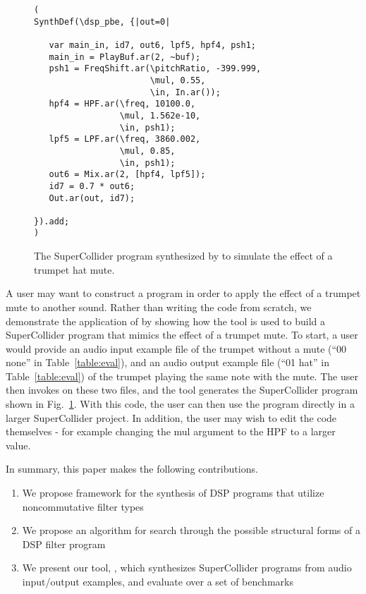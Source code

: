 \begin{figure}
\begin{lstlisting}
( 
SynthDef(\dsp_pbe, {|out=0|

   var main_in, id7, out6, lpf5, hpf4, psh1;
   main_in = PlayBuf.ar(2, ~buf);
   psh1 = FreqShift.ar(\pitchRatio, -399.999, 
                       \mul, 0.55, 
                       \in, In.ar());
   hpf4 = HPF.ar(\freq, 10100.0, 
                 \mul, 1.562e-10, 
                 \in, psh1);
   lpf5 = LPF.ar(\freq, 3860.002, 
                 \mul, 0.85, 
                 \in, psh1);
   out6 = Mix.ar(2, [hpf4, lpf5]);
   id7 = 0.7 * out6;
   Out.ar(out, id7);

}).add;
)
\end{lstlisting}
\caption{The SuperCollider program synthesized by \ourTool to simulate the effect of a trumpet hat mute.}
\label{fig:sc_code}
\end{figure}

A user may want to construct a program in order to apply the effect of a trumpet mute to another sound.
Rather than writing the code from scratch, we demonstrate the application of \ourTool by showing how the tool is used to build a SuperCollider program that mimics the effect of a trumpet mute.
To start, a user would provide an audio input example file of the trumpet without a mute (``00 none'' in Table~\ref{table:eval}), and an audio output example file (``01 hat'' in Table~\ref{table:eval}) of the trumpet playing the same note with the mute.
The user then invokes \ourTool on these two files, and the tool generates the SuperCollider program shown in Fig.~\ref{fig:sc_code}.
With this code, the user can then use the program directly in a larger SuperCollider project.
In addition, the user may wish to edit the code themselves - for example changing the mul argument to the HPF to a larger value.

In summary, this paper makes the following contributions.

\begin{enumerate}
\item We propose framework for the synthesis of DSP programs that utilize noncommutative filter types 
\item We propose an algorithm for search through the possible structural forms of a DSP filter program
\item We present our tool, \ourTool, which synthesizes SuperCollider programs from audio input/output examples, and evaluate \ourTool over a set of benchmarks
\end{enumerate}



